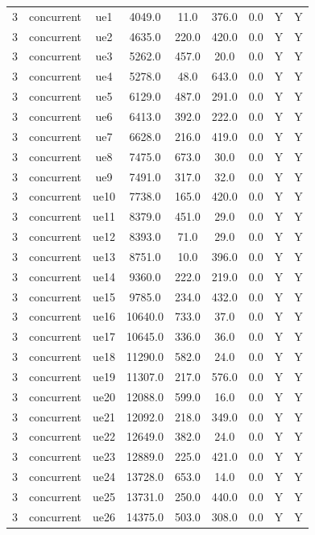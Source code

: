 \begin{table}[ht]
\begin{tabular}{|c|c|c|c|c|c|c|c|c|}
\hline
3 & concurrent & ue1 & 4049.0 & 11.0 & 376.0 & 0.0 & Y & Y \\
3 & concurrent & ue2 & 4635.0 & 220.0 & 420.0 & 0.0 & Y & Y \\
3 & concurrent & ue3 & 5262.0 & 457.0 & 20.0 & 0.0 & Y & Y \\
3 & concurrent & ue4 & 5278.0 & 48.0 & 643.0 & 0.0 & Y & Y \\
3 & concurrent & ue5 & 6129.0 & 487.0 & 291.0 & 0.0 & Y & Y \\
3 & concurrent & ue6 & 6413.0 & 392.0 & 222.0 & 0.0 & Y & Y \\
3 & concurrent & ue7 & 6628.0 & 216.0 & 419.0 & 0.0 & Y & Y \\
3 & concurrent & ue8 & 7475.0 & 673.0 & 30.0 & 0.0 & Y & Y \\
3 & concurrent & ue9 & 7491.0 & 317.0 & 32.0 & 0.0 & Y & Y \\
3 & concurrent & ue10 & 7738.0 & 165.0 & 420.0 & 0.0 & Y & Y \\
3 & concurrent & ue11 & 8379.0 & 451.0 & 29.0 & 0.0 & Y & Y \\
3 & concurrent & ue12 & 8393.0 & 71.0 & 29.0 & 0.0 & Y & Y \\
3 & concurrent & ue13 & 8751.0 & 10.0 & 396.0 & 0.0 & Y & Y \\
3 & concurrent & ue14 & 9360.0 & 222.0 & 219.0 & 0.0 & Y & Y \\
3 & concurrent & ue15 & 9785.0 & 234.0 & 432.0 & 0.0 & Y & Y \\
3 & concurrent & ue16 & 10640.0 & 733.0 & 37.0 & 0.0 & Y & Y \\
3 & concurrent & ue17 & 10645.0 & 336.0 & 36.0 & 0.0 & Y & Y \\
3 & concurrent & ue18 & 11290.0 & 582.0 & 24.0 & 0.0 & Y & Y \\
3 & concurrent & ue19 & 11307.0 & 217.0 & 576.0 & 0.0 & Y & Y \\
3 & concurrent & ue20 & 12088.0 & 599.0 & 16.0 & 0.0 & Y & Y \\
3 & concurrent & ue21 & 12092.0 & 218.0 & 349.0 & 0.0 & Y & Y \\
3 & concurrent & ue22 & 12649.0 & 382.0 & 24.0 & 0.0 & Y & Y \\
3 & concurrent & ue23 & 12889.0 & 225.0 & 421.0 & 0.0 & Y & Y \\
3 & concurrent & ue24 & 13728.0 & 653.0 & 14.0 & 0.0 & Y & Y \\
3 & concurrent & ue25 & 13731.0 & 250.0 & 440.0 & 0.0 & Y & Y \\
3 & concurrent & ue26 & 14375.0 & 503.0 & 308.0 & 0.0 & Y & Y \\

\end{tabular}
\end{table}
